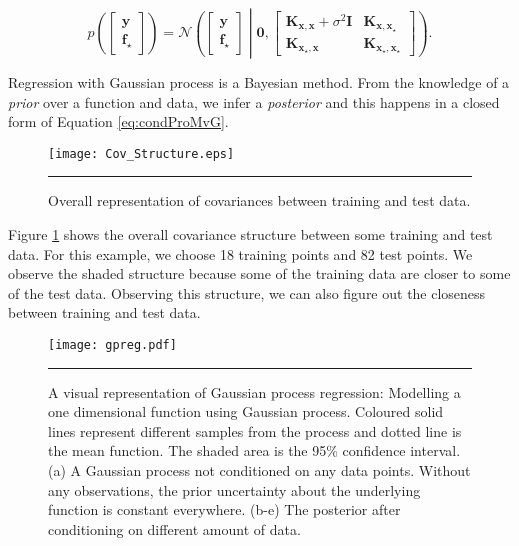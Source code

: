 \begin{equation} \label{eq:jointPro_y_f*}
p \left( \begin{bmatrix} \mathbf{y} \\\mathbf{f_\star} \end{bmatrix} \right) =
\mathcal{N}\left( \begin{bmatrix} \mathbf{y} \\\mathbf{f_\star} \end{bmatrix} \middle|
\mathbf{0}, \begin{bmatrix} \mathbf{K_{x,x}}+ \sigma^2\mathbf{I} & \mathbf{K_{x,x_\star}} \\
			    \mathbf{K_{x_\star,x}} & \mathbf{K_{x_\star,x_\star}} \end{bmatrix} \right).
\end{equation}

Regression with Gaussian process is a Bayesian method. From the knowledge of a \emph{prior} over a function and data, we infer a \emph{posterior} and this happens in a closed form of Equation \ref{eq:condProMvG}. 

\begin{figure}[t]
	\centering
		\texttt{[image: Cov\_Structure.eps]}
		\rule{35em}{0.5pt}
	\caption[Overall representation of covariances between training and test data]
		{Overall representation of covariances between training and test data.}
	\label{fig:Covariances_Structure}
\end{figure}

Figure \ref{fig:Covariances_Structure} shows the overall covariance structure between some training and test data. For this example, we choose 18 training points and 82 test points. We observe the shaded structure because some of the training data are closer to some of the test data. Observing this structure, we can also figure out the closeness between training and test data. 

\begin{figure}
	\centering
		\texttt{[image: gpreg.pdf]}
		\rule{35em}{0.5pt}
	\caption[A visual representation of Gaussian process regression: Modelling a one dimensional function using Gaussian process]
		{A visual representation of Gaussian process regression: Modelling a one dimensional function using Gaussian process. Coloured solid lines represent different samples from the process and dotted line is the mean function. The shaded area is the 95\% confidence interval. (a) A Gaussian process not conditioned on any data points. Without any observations, the prior uncertainty about the underlying function is constant everywhere. (b-e) The posterior after conditioning on different amount of data.}
	\label{fig:dempGPReg}
\end{figure}

